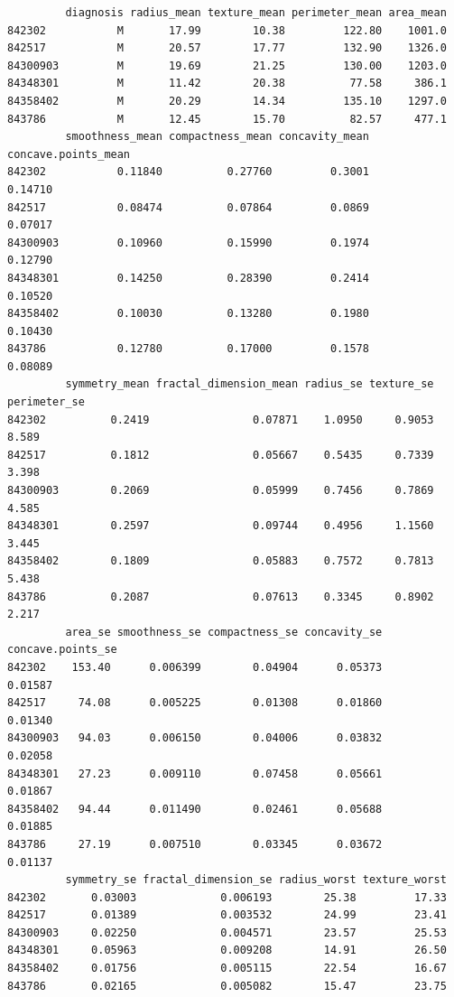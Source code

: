 \documentclass[
  letterpaper,
  DIV=11,
  numbers=noendperiod]{scrartcl}
\begin{document}
\begin{verbatim}
         diagnosis radius_mean texture_mean perimeter_mean area_mean
842302           M       17.99        10.38         122.80    1001.0
842517           M       20.57        17.77         132.90    1326.0
84300903         M       19.69        21.25         130.00    1203.0
84348301         M       11.42        20.38          77.58     386.1
84358402         M       20.29        14.34         135.10    1297.0
843786           M       12.45        15.70          82.57     477.1
         smoothness_mean compactness_mean concavity_mean concave.points_mean
842302           0.11840          0.27760         0.3001             0.14710
842517           0.08474          0.07864         0.0869             0.07017
84300903         0.10960          0.15990         0.1974             0.12790
84348301         0.14250          0.28390         0.2414             0.10520
84358402         0.10030          0.13280         0.1980             0.10430
843786           0.12780          0.17000         0.1578             0.08089
         symmetry_mean fractal_dimension_mean radius_se texture_se perimeter_se
842302          0.2419                0.07871    1.0950     0.9053        8.589
842517          0.1812                0.05667    0.5435     0.7339        3.398
84300903        0.2069                0.05999    0.7456     0.7869        4.585
84348301        0.2597                0.09744    0.4956     1.1560        3.445
84358402        0.1809                0.05883    0.7572     0.7813        5.438
843786          0.2087                0.07613    0.3345     0.8902        2.217
         area_se smoothness_se compactness_se concavity_se concave.points_se
842302    153.40      0.006399        0.04904      0.05373           0.01587
842517     74.08      0.005225        0.01308      0.01860           0.01340
84300903   94.03      0.006150        0.04006      0.03832           0.02058
84348301   27.23      0.009110        0.07458      0.05661           0.01867
84358402   94.44      0.011490        0.02461      0.05688           0.01885
843786     27.19      0.007510        0.03345      0.03672           0.01137
         symmetry_se fractal_dimension_se radius_worst texture_worst
842302       0.03003             0.006193        25.38         17.33
842517       0.01389             0.003532        24.99         23.41
84300903     0.02250             0.004571        23.57         25.53
84348301     0.05963             0.009208        14.91         26.50
84358402     0.01756             0.005115        22.54         16.67
843786       0.02165             0.005082        15.47         23.75

\end{verbatim}
\end{document}
